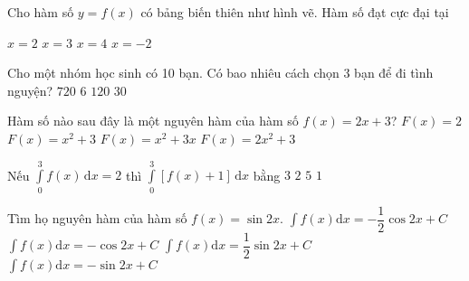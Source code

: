 \begin{ex}%
	Cho hàm số $y=f(x)$ có bảng biến thiên như hình vẽ. Hàm số đạt cực đại tại
	\begin{center}
	\end{center}
	\choice
	{\True $x=2$}
	{$x=3$}
	{$x=4$}
	{$x=-2$}
\end{ex}

\begin{ex}%
	Cho một nhóm học sinh có 10 bạn. Có bao nhiêu cách chọn 3 bạn để đi tình nguyện?
	\choice
	{$720$}
	{$6$}
	{\True $120$}
	{$30$}
\end{ex}

\begin{ex}%
	Hàm số nào sau đây là một nguyên hàm của hàm số $f(x)=2x+3$?
	\choice
	{$F(x)=2$}
	{$F(x)=x^2+3$}
	{\True $F(x)=x^2+3x$}
	{$F(x)=2x^2+3$}
\end{ex}

\begin{ex}%
	Nếu $\displaystyle\int\limits_0^3 f(x)\mathrm{\,d}x=2$ thì $\displaystyle\int\limits_0^3 [f(x)+1]\mathrm{\,d}x$ bằng
	\choice
	{$3$}
	{$2$}
	{\True $5$}
	{$1$}
\end{ex}

\begin{ex}%
	Tìm họ nguyên hàm của hàm số $f(x)=\sin 2x$.
	\choice
	{\True $\displaystyle\int{f(x)\mathrm{d}x}=-\dfrac{1}{2}\cos 2x+C$}
	{$\displaystyle\int{f(x)\mathrm{d}x}=-\cos 2x+C$}
	{$\displaystyle\int{f(x)\mathrm{d}x}=\dfrac{1}{2}\sin 2x+C$}
	{$\displaystyle\int{f(x)\mathrm{d}x}=-\sin 2x+C$}
\end{ex}

